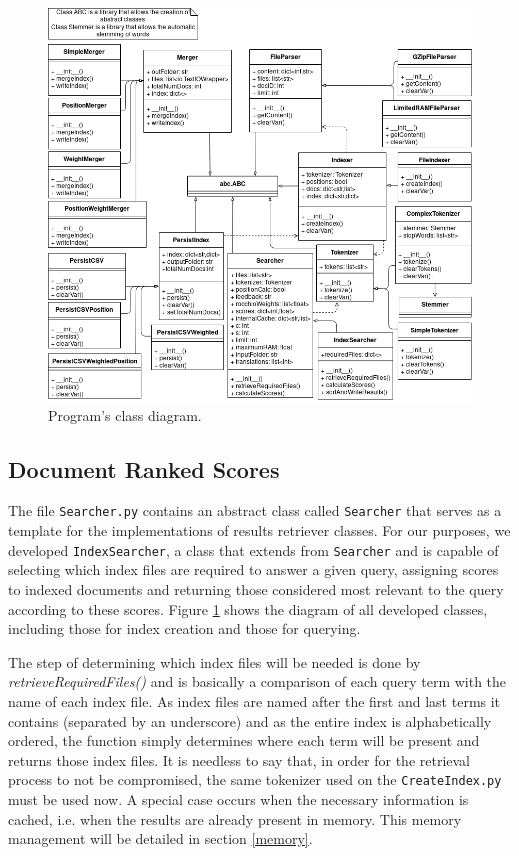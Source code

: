 \documentclass[12pt]{article}
\begin{document}
\begin{figure}[h!]
\includegraphics[width=\linewidth]{ClassDiagram_assign3.png}
\caption{Program's class diagram.}
\label{fig:classdiagram}
\end{figure}

\newpage
\subsection{Document Ranked Scores}

The file \texttt{Searcher.py} contains an abstract class called \texttt{Searcher}
that serves as a template for the implementations of results retriever classes.
For our purposes, we developed \texttt{IndexSearcher}, a class that extends from
\texttt{Searcher} and is capable of selecting which index files are required to 
answer a given query, assigning scores to indexed documents and returning those 
considered most relevant to the query according to these scores.
Figure \ref{fig:classdiagram} shows the diagram of all developed classes, 
including those for index creation and those for querying.

The step of determining which index files will be needed is done by 
\textit{retrieveRequiredFiles()} and is basically a comparison of each query 
term with the name of each index file.
As index files are named after the first and last terms it contains (separated
by an underscore) and as the entire index is alphabetically ordered, the function
simply determines where each term will be present and returns those index files. 
It is needless to say that, in order for the retrieval process to not be compromised, 
the same tokenizer used on the \texttt{CreateIndex.py} must be used now.
A special case occurs when the necessary information is cached, i.e. when the 
results are already present in memory. 
This memory management will be detailed in section \ref{memory}.
\end{document}
